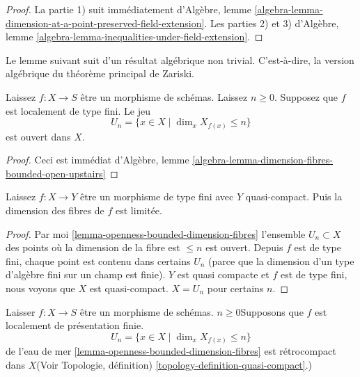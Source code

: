 \begin{proof}
La partie 1) suit immédiatement d'Algèbre, lemme \ref{algebra-lemma-dimension-at-a-point-preserved-field-extension}. Les parties 2) et 3) d'Algèbre, lemme \ref{algebra-lemma-inequalities-under-field-extension}.
\end{proof}

\noindent
Le lemme suivant suit d'un résultat algébrique non trivial. C'est-à-dire, la version algébrique du théorème principal de Zariski.

\begin{lemma}

\label{lemma-openness-bounded-dimension-fibres}

\begin{reference}
\cite[IV théorème 13.1.3]{EGA}
\end{reference}
Laissez $f : X \to S$ être un morphisme de schémas. Laissez $n \geq 0$. Supposez que $f$ est localement de type fini. Le jeu $$
U_n = \{x \in X \mid \dim_x X_{f(x)} \leq n\}
$$ est ouvert dans $X$.
\end{lemma}

\begin{proof}
Ceci est immédiat d'Algèbre, lemme \ref{algebra-lemma-dimension-fibres-bounded-open-upstairs}
\end{proof}

\begin{lemma}

\label{lemma-morphism-finite-type-bounded-dimension}
Laissez $f : X \to Y$ être un morphisme de type fini avec $Y$ quasi-compact. Puis la dimension des fibres de $f$ est limitée.
\end{lemma}

\begin{proof}

Par moi \ref{lemma-openness-bounded-dimension-fibres}
l'ensemble $U_n \subset X$ des points où la dimension de la fibre est $\leq n$ est ouvert. Depuis $f$ est de type fini, chaque point est contenu dans certains $U_n$ (parce que la dimension d'un type d'algèbre fini sur un champ est finie). $Y$ est quasi compacte et $f$ est de type fini, nous voyons que $X$ est quasi-compact. $X = U_n$ pour certains $n$.

\end{proof}

\begin{lemma}

\label{lemma-openness-bounded-dimension-fibres-finite-presentation}

Laisser $f : X \to S$ être un morphisme de schémas. $n \geq 0$Supposons que $f$ est localement de présentation finie.
$$
U_n = \{x \in X \mid \dim_x X_{f(x)} \leq n\}
$$
de l'eau de mer \ref{lemma-openness-bounded-dimension-fibres} est rétrocompact dans $X$(Voir Topologie, définition) \ref{topology-definition-quasi-compact}.)

\end{lemma}

